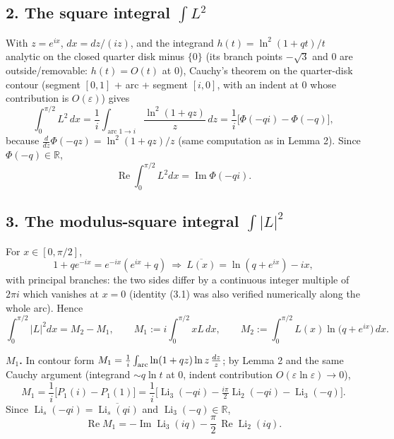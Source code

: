 \documentclass[11pt]{article}
\theoremstyle{remark}
\begin{document}
\subsection*{2. The square integral $\int L^2$}

With $z=e^{ix}$, $dx=dz/(iz)$, and the integrand $h(t)=\ln^2(1+qt)/t$ analytic on the closed quarter disk minus $\{0\}$ (its branch points $-\sqrt3$ and $0$ are outside/removable: $h(t)=O(t)$ at $0$), Cauchy's theorem on the quarter-disk contour (segment $[0,1]$ + arc + segment $[i,0]$, with an indent at $0$ whose contribution is $O(\varepsilon)$) gives
\[
\int_0^{\pi/2}L^2\,dx=\frac1i\int_{\operatorname{arc} 1\to i}\frac{\ln^2(1+qz)}{z}\,dz
=\frac1i\Big[\Phi(-qi)-\Phi(-q)\Big],
\]
because $\frac{d}{dz}\Phi(-qz)=\ln^2(1+qz)/z$ (same computation as in Lemma 2). Since $\Phi(-q)\in\mathbb R$,
\begin{equation*}
\operatorname{Re}\int_0^{\pi/2}L^2dx=\operatorname{Im}\Phi(-qi). \tag{2.1}
\end{equation*}

\subsection*{3. The modulus-square integral $\int|L|^2$}

For $x\in[0,\pi/2]$,
\begin{equation*}
1+qe^{-ix}=e^{-ix}\left(e^{ix}+q\right)
\ \Longrightarrow\ \overline{L(x)}=\ln\!\left(q+e^{ix}\right)-ix, \tag{3.1}
\end{equation*}
with principal branches: the two sides differ by a continuous integer multiple of $2\pi i$ which vanishes at $x=0$ (identity (3.1) was also verified numerically along the whole arc). Hence
\[
\int_0^{\pi/2}|L|^2dx=M_2-M_1,\qquad
M_1:=i\int_0^{\pi/2}xL\,dx,\qquad
M_2:=\int_0^{\pi/2}L(x)\ln\!\big(q+e^{ix}\big)\,dx .
\]

\textbf{$M_1$.} In contour form $M_1=\frac1i\int_{\rm arc}\ln(1+qz)\ln z\,\frac{dz}{z}$; by Lemma 2 and the same Cauchy argument (integrand $\sim q\ln t$ at $0$, indent contribution $O(\varepsilon\ln\varepsilon)\to0$),
\[
M_1=\frac1i\Big[P_1(i)-P_1(1)\Big]
=\frac1i\Big[\operatorname{Li}_3(-qi)-\tfrac{i\pi}2\operatorname{Li}_2(-qi)-\operatorname{Li}_3(-q)\Big].
\]
Since $\operatorname{Li}_s(-qi)=\overline{\operatorname{Li}_s(qi)}$ and $\operatorname{Li}_3(-q)\in\mathbb R$,
\begin{equation*}
\operatorname{Re}M_1=-\operatorname{Im}\operatorname{Li}_3(iq)-\frac{\pi}{2}\,\operatorname{Re}\operatorname{Li}_2(iq). \tag{3.2}
\end{equation*}
\end{document}
